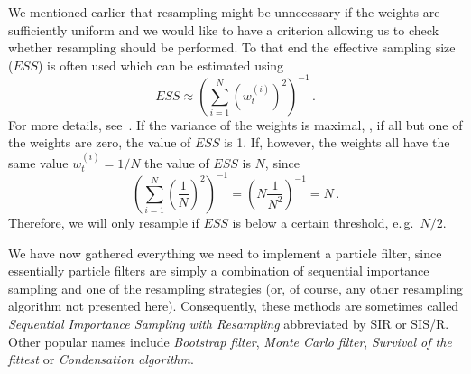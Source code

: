 We mentioned earlier that resampling might be unnecessary if the
weights are sufficiently uniform and we would like to have a criterion
allowing us to check whether resampling should be performed. To that
end the effective sampling size ($ESS$) is often used which can be
estimated using
\begin{equation}
  \label{eq:ESS}
  ESS \approx {\left( \sum_{i=1}^N {\left( w_t^{(i)} \right)}^2
    \right)}^{-1} \,.
\end{equation}
For more details, see~\cite[179]{arulampalam}. If the variance of the
weights is maximal, \ie, if all but one of the weights are zero, the
value of $ESS$ is 1. If, however, the weights all have the same value
$w_t^{(i)} = 1/N$ the value of $ESS$ is $N$, since
\[
  {\left( \sum_{i=1}^N {\left( \frac{1}{N} \right)}^2 \right)}^{-1} =
  {\left( N \frac{1}{N^2} \right)}^{-1} = N \,.
\]
Therefore, we will only resample if $ESS$ is below a certain
threshold, e.\,g.\ $N/2$.

We have now gathered everything we need to implement a particle
filter, since essentially particle filters are simply a combination of
sequential importance sampling and one of the resampling strategies
(or, of course, any other resampling algorithm not presented
here). Consequently, these methods are sometimes called
\emph{Sequential Importance Sampling with Resampling} abbreviated by
SIR or SIS/R. Other popular names include \emph{Bootstrap filter},
\emph{Monte Carlo filter}, \emph{Survival of the fittest} or
\emph{Condensation algorithm}.

